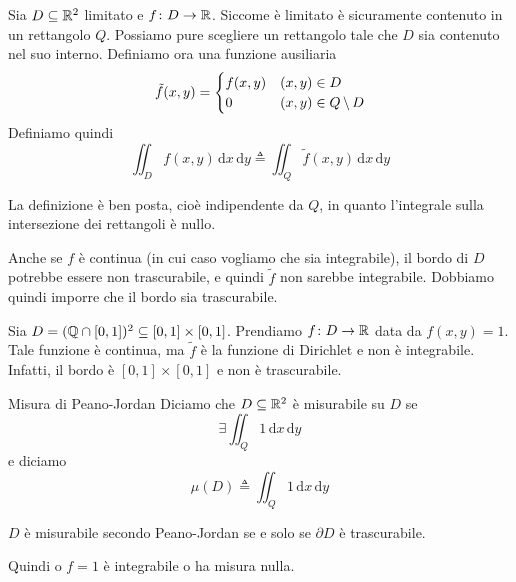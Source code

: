 \documentclass[a4paper]{article}
\begin{document}
Sia \(D \subseteq \mathbb{R}^2\) limitato e \(f \colon D \to \mathbb{R}\). Siccome
è limitato è sicuramente contenuto in un rettangolo \(Q\).
Possiamo pure scegliere un rettangolo tale che \(D\) sia contenuto nel suo interno.
Definiamo ora una funzione ausiliaria
\[
    \tilde f(x,y) = \begin{cases}
        f(x,y) & (x,y) \in D \\
        0 & (x,y) \in Q \,\backslash\, D
    \end{cases}
\]
Definiamo quindi
\[
    \iint_D f(x,y) \,\text{d}x\,\text{d}y
    \triangleq \iint_Q \tilde f(x,y) \,\text{d}x\,\text{d}y
\]

La definizione è ben posta, cioè indipendente da \(Q\), in quanto
l'integrale sulla intersezione dei rettangoli è nullo.

Anche se \(f\) è continua (in cui caso vogliamo che sia integrabile),
il bordo di \(D\) potrebbe essere non trascurabile, e quindi \(\tilde f\) non sarebbe integrabile.
Dobbiamo quindi imporre che il bordo sia trascurabile.

\begin{snippetexample}{}
    Sia \(D = (\mathbb{Q} \cap [0,1])^2 \subseteq [0,1] \times [0,1]\).
    Prendiamo \(f \colon D \to \mathbb{R}\) data da \(f(x,y) = 1\).
    Tale funzione è continua, ma \(\tilde f\) è la funzione di Dirichlet
    e non è integrabile. Infatti, il bordo è \([0,1] \times [0,1]\) e non è trascurabile.
\end{snippetexample}

\begin{snippetdefinition}{Misura di Peano-Jordan}
    Diciamo che \(D \subseteq \mathbb{R}^2\) è misurabile su \(D\) se
    \[
        \exists \iint_Q 1\,\text{d}x\,\text{d}y
    \]
    e diciamo
    \[
        \mu(D) \triangleq \iint_Q 1 \,\text{d}x\,\text{d}y
    \]
\end{snippetdefinition}

\begin{snippettheorem}{}
    \(D\) è misurabile secondo Peano-Jordan se e solo se \(\partial D\)
    è trascurabile.
\end{snippettheorem}

Quindi o \(f=1\) è integrabile o ha misura nulla.
\end{document}
